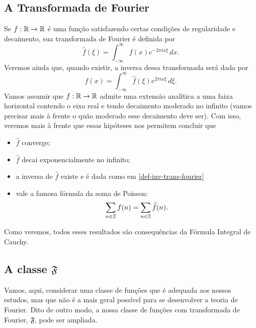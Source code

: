     \subsection{A Transformada de Fourier}
        Se $f:\mathbb{R}\to\mathbb{R}$ é uma função satisfazendo certas condições de regularidade e decaimento,
        sua transformada de Fourier é definida por
        \begin{equation}
        \label{def-transf-fourier}
            \widehat{f}(\xi) = \int_{-\infty}^{\infty} f(x) e^{-2\pi ix\xi} \, dx.
        \end{equation}
        Veremos ainda que, quando existir, a inversa dessa transformada será dada por
        \begin{equation*}
        \label{def-inv-trans-fourier}
            f(x) = \int_{-\infty}^{\infty} \widehat{f}(\xi) e^{2\pi ix\xi} \, d\xi.
        \end{equation*}
        Vamos assumir que $f:\mathbb{R}\to\mathbb{R}$ admite uma extensão analítica a uma faixa horizontal contendo
        o eixo real e tendo decaimento moderado no infinito (vamos precisar mais à frente o quão
        moderado esse decaimento deve ser). Com isso, veremos mais à frente que essas hipóteses
        nos permitem concluir que
        \begin{itemize}
            \item $\widehat{f}$ converge;
            \item $\widehat{f}$ decai exponencialmente no infinito;
            \item a inversa de $\widehat{f}$ existe e é dada como em \eqref{def-inv-trans-fourier}
            \item vale a famosa fórmula da soma de Poisson:
            \begin{equation}
            \label{def-soma-poisson}
                \sum_{n\in\mathbb{Z}} f(n) = \sum_{n\in\mathbb{Z}} \widehat{f}(n).
            \end{equation}
        \end{itemize}
        Como veremos, todos esses resultados são consequências da Fórmula Integral de Cauchy.
        
    \subsection{A classe \texorpdfstring{$\mathfrak{F}$}{F}}
        Vamos, aqui, considerar uma classe de funções que é adequada aos nossos estudos, mas
        que não é a mais geral possível para se desenvolver a teoria de Fourier. Dito de outro
        modo, a nossa classe de funções com transformada de Fourier, $\mathfrak{F}$, pode ser
        ampliada.
        
